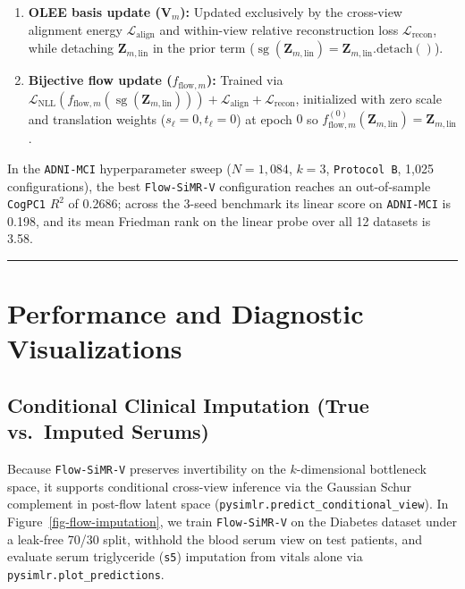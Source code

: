 \documentclass[
  10pt,
  letterpaper,
]{report}
\providecommand{\tightlist}{%
  \setlength{\itemsep}{0pt}\setlength{\parskip}{0pt}}
\begin{document}
\begin{enumerate}
\def\labelenumi{\arabic{enumi}.}
\tightlist
\item
  \textbf{OLEE basis update (\(\mathbf{V}_m\)):} Updated exclusively by
  the cross-view alignment energy \(\mathcal{L}_{\text{align}}\) and
  within-view relative reconstruction loss
  \(\mathcal{L}_{\text{recon}}\), while detaching
  \(\mathbf{Z}_{m,\text{lin}}\) in the prior term
  (\(\operatorname{sg}(\mathbf{Z}_{m,\text{lin}}) = \mathbf{Z}_{m,\text{lin}}.\text{detach}()\)).
\item
  \textbf{Bijective flow update (\(f_{\text{flow},m}\)):} Trained via
  \(\mathcal{L}_{\text{NLL}}(f_{\text{flow},m}(\operatorname{sg}(\mathbf{Z}_{m,\text{lin}}))) + \mathcal{L}_{\text{align}} + \mathcal{L}_{\text{recon}}\),
  initialized with zero scale and translation weights
  (\(s_\ell = 0, t_\ell = 0\)) at epoch \(0\) so
  \(f_{\text{flow},m}^{(0)}(\mathbf{Z}_{m,\text{lin}}) = \mathbf{Z}_{m,\text{lin}}\).
\end{enumerate}

In the \texttt{ADNI-MCI} hyperparameter sweep (\(N = 1,084\), \(k = 3\),
\texttt{Protocol\ B}, 1,025 configurations), the best
\texttt{Flow-SiMR-V} configuration reaches an out-of-sample
\texttt{CogPC1} \(R^2\) of 0.2686; across the 3-seed benchmark its
linear score on \texttt{ADNI-MCI} is 0.198, and its mean Friedman rank
on the linear probe over all 12 datasets is 3.58.

\begin{center}\rule{0.5\linewidth}{0.5pt}\end{center}

\section{Performance and Diagnostic
Visualizations}\label{performance-and-diagnostic-visualizations}

\subsection{Conditional Clinical Imputation (True vs.~Imputed
Serums)}\label{conditional-clinical-imputation-true-vs.-imputed-serums}

Because \texttt{Flow-SiMR-V} preserves invertibility on the
\(k\)-dimensional bottleneck space, it supports conditional cross-view
inference via the Gaussian Schur complement in post-flow latent space
(\texttt{pysimlr.predict\_conditional\_view}). In
Figure~\ref{fig-flow-imputation}, we train \texttt{Flow-SiMR-V} on the
Diabetes dataset under a leak-free 70/30 split, withhold the blood serum
view on test patients, and evaluate serum triglyceride (\texttt{s5})
imputation from vitals alone via \texttt{pysimlr.plot\_predictions}.
\end{document}
